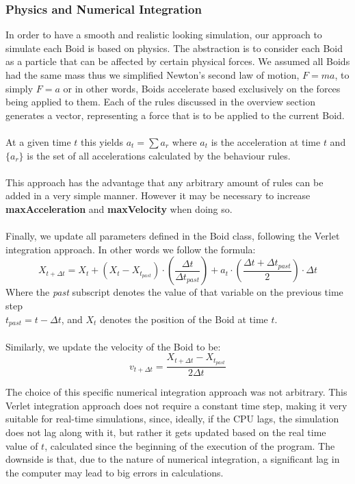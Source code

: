 \documentclass[12pt]{article}
\begin{document}
\subsubsection{Physics and Numerical Integration}
In order to have a smooth and realistic looking simulation, our approach to simulate each Boid is based on physics. The abstraction is to consider each Boid as a particle that can be affected by certain physical forces. We assumed all Boids had the same mass thus we simplified Newton's second law of motion, $F=ma$, to simply $F=a$ or in other words, Boids accelerate based exclusively on the forces being applied to them. Each of the rules discussed in the overview section generates a vector, representing a force that is to be applied to the current Boid. 
\\ \\
At a given time $t$ this yields $a_t = \sum a_r$ where $a_t$ is the acceleration at time $t$ and $\{a_r\}$ is the set of all accelerations calculated by the behaviour rules. 
\\ \\
This approach has the advantage that any arbitrary amount of rules can be added in a very simple manner. However it may be necessary to increase \textbf{maxAcceleration} and \textbf{maxVelocity} when doing so.
\\ \\
Finally, we update all parameters defined in the Boid class, following the Verlet integration approach. In other words we follow the formula:
$$X_{t+\Delta t} = X_t + (X_t-X_{t_{past}})\cdot(\frac{\Delta t}{\Delta t_{past}}) + a_t\cdot(\frac{\Delta t + \Delta t_{past}}{2})\cdot\Delta t$$
Where the \textit{past} subscript denotes the value of that variable on the previous time step\\
$t_{past}=t-\Delta t$, and $X_t$ denotes the position of the Boid at time $t$.
\\ \\
Similarly, we update the velocity of the Boid to be: 
$$v_{t+\Delta t} = \frac{X_{t+\Delta t} - X_{t_{past}}}{2\Delta t}$$

The choice of this specific numerical integration approach was not arbitrary. This Verlet integration approach does not require a constant time step, making it very suitable for real-time simulations, since, ideally, if the CPU lags, the simulation does not lag along with it, but rather it gets updated based on the real time value of $t$, calculated since the beginning of the execution of the program. The downside is that, due to the nature of numerical integration, a significant lag in the computer may lead to big errors in calculations.
\end{document}
